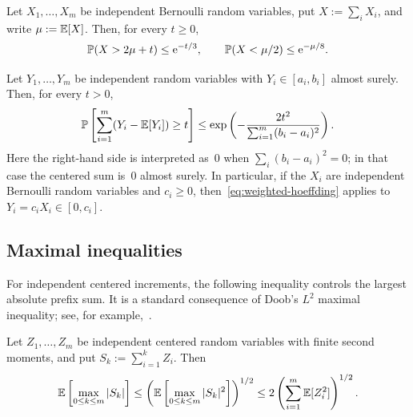 \documentclass[12pt,a4paper,oneside]{report}
\begin{document}
\begin{lemma}
\label{lem:chernoff-bernstein}
Let $X_1,\ldots,X_m$ be independent Bernoulli random variables, put
$X:=\sum_iX_i$, and write $\mu:=\mathbb{E}[X]$.  Then, for every $t\ge0$,
\begin{equation}\label{eq:chernoff-useful}
    \mathbb{P}(X>2\mu+t)\le\mathrm{e}^{-t/3},
    \qquad
    \mathbb{P}(X<\mu/2)\le\mathrm{e}^{-\mu/8}.
\end{equation}
\end{lemma}

\begin{lemma}
\label{lem:weighted-hoeffding}
Let $Y_1,\ldots,Y_m$ be independent random variables with
$Y_i\in[a_i,b_i]$ almost surely.  Then, for every $t>0$,
\begin{equation}\label{eq:weighted-hoeffding}
    \mathbb{P}\left[\sum_{i=1}^m(Y_i-\mathbb{E}[Y_i])\ge t\right]
    \le
    \exp\left(-\frac{2t^2}{\sum_{i=1}^m(b_i-a_i)^2}\right).
\end{equation}
Here the right-hand side is interpreted as~$0$ when
$\sum_i(b_i-a_i)^2=0$; in that case the centered sum is~$0$ almost surely.
In particular, if the $X_i$ are independent Bernoulli random variables and
$c_i\ge0$, then~\cref{eq:weighted-hoeffding} applies to
$Y_i=c_iX_i\in[0,c_i]$.
\end{lemma}

\subsection{Maximal inequalities}

For independent centered increments, the following inequality controls the
largest absolute prefix sum. It is a standard consequence of Doob's $L^2$
maximal inequality; see, for example,~\cite[Theorem~4.4.4]{Durrett2019}.

\begin{lemma}
\label{lem:maximal-independent-sums}
Let $Z_1,\ldots,Z_m$ be independent centered random variables with finite
second moments, and put $S_k:=\sum_{i=1}^kZ_i$.  Then
\begin{equation}\label{eq:l2-maximal}
    \mathbb{E}\left[\max_{0\le k\le m}|S_k|\right]
    \le
    \left(\mathbb{E}\left[\max_{0\le k\le m}|S_k|^2\right]\right)^{1/2}
    \le2\left(\sum_{i=1}^m\mathbb{E}[Z_i^2]\right)^{1/2}.
\end{equation}
\end{lemma}

\end{document}
